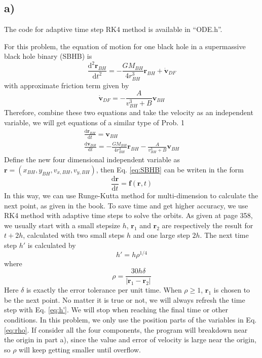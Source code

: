 \documentclass[12pt, graphicx]{article}
\begin{document}
\subsection*{a)}
The code for adaptive time step RK4 method is available in \textquotedblleft ODE.h\textquotedblright. \par
For this problem, the equation of motion for one black hole in a supermassive black hole binary (SBHB) is 
\begin{equation}
\frac{\mathrm{d}^2\mathbf{r}_{BH}}{\mathrm{d}t^2}=-\frac{GM_{BH}}{4r^3_{BH}}\mathbf{r}_{BH}+\dot{\mathbf{v}}_{DF}
\end{equation}
with approximate friction term given by
\begin{equation}
\dot{\mathbf{v}}_{DF}=-\frac{A}{v^3_{BH}+B}\mathbf{v}_{BH}
\end{equation}
Therefore, combine these two equations and take the velocity as an independent variable, we will get equations of a similar type of Prob. 1
\begin{equation}
\begin{gathered}
\frac{\mathrm{d}\mathbf{r}_{BH}}{\mathrm{d}t}=\mathbf{v}_{BH}\\
\frac{\mathrm{d}\mathbf{v}_{BH}}{\mathrm{d}t}=-\frac{GM_{BH}}{4r^3_{BH}}\mathbf{r}_{BH}-\frac{A}{v^3_{BH}+B}\mathbf{v}_{BH}
\end{gathered}
\label{eq:SBHB}
\end{equation}
Define the new four dimensional independent variable as $\mathbf{r}=(x_{BH}, y_{BH}, v_{x,BH}, v_{y,BH})$, then Eq. \ref{eq:SBHB} can be writen in the form
\begin{equation}
\frac{\mathrm{d}\mathbf{r}}{\mathrm{d}t}=\mathbf{f}(\mathbf{r},t)
\end{equation}
In this way, we can use Runge-Kutta method for multi-dimension to calculate the next point, as given in the book. To save time and get higher accuracy, we use RK4 method with adaptive time steps to solve the orbits. As given at page 358, we usually start with a small stepsize $h$, $\mathbf{r}_1$ and $\mathbf{r}_2$ are respectively the result for $t+2h$, calculated with two small steps $h$ and one large step $2h$. The next time step $h'$ is calculated by
\begin{equation}
h'=h\rho^{1/4}
\label{eq:h'}
\end{equation}
where
\begin{equation}
\rho=\frac{30h\delta}{|\mathbf{r}_1-\mathbf{r}_2|}
\label{eq:rho}
\end{equation}
Here $\delta$ is exactly the error tolerance per unit time. When $\rho\geq1$, $\mathbf{r}_1$ is chosen to be the next point. No matter it is true or not, we will always refresh the time step with Eq. \ref{eq:h'}. We will stop when reaching the final time or other conditions. In this problem, we only use the position parts of the variables in Eq. \ref{eq:rho}. If consider all the four components, the program will breakdown near the origin in part a), since the value and error of velocity is large near the origin, so $\rho$ will keep getting smaller until overflow.\par
\end{document}
